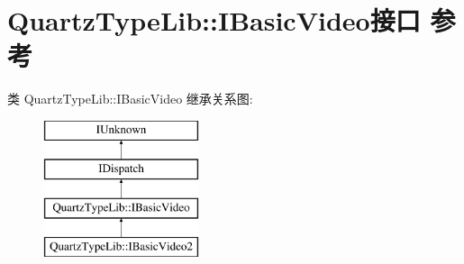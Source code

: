 \hypertarget{interface_quartz_type_lib_1_1_i_basic_video}{}\section{Quartz\+Type\+Lib\+:\+:I\+Basic\+Video接口 参考}
\label{interface_quartz_type_lib_1_1_i_basic_video}
类 Quartz\+Type\+Lib\+:\+:I\+Basic\+Video 继承关系图\+:\begin{figure}[H]
\begin{center}
\leavevmode
\includegraphics[height=4.000000cm]{interface_quartz_type_lib_1_1_i_basic_video}
\end{center}
\end{figure}
